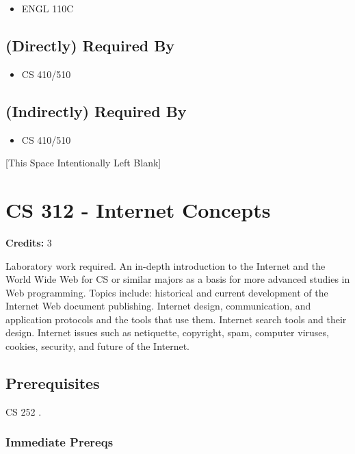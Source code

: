 \documentclass[]{article}
\providecommand{\tightlist}{%
  \setlength{\itemsep}{0pt}\setlength{\parskip}{0pt}}
\newcommand{\pagebreakhere}{
\vspace*{\fill}
\begin{center}
[This Space Intentionally Left Blank]
\end{center}
\vspace*{\fill}
\newpage
}
\begin{document}
\begin{itemize}
\tightlist
\item
  ENGL 110C
\end{itemize}

\subsection{(Directly) Required By}\label{directly-required-by-5}

\begin{itemize}
\tightlist
\item
  CS 410/510
\end{itemize}

\subsection{(Indirectly) Required By}\label{indirectly-required-by-5}

\begin{itemize}
\tightlist
\item
  CS 410/510
\end{itemize}

\pagebreakhere
\section{CS 312 - Internet Concepts}\label{cs-312---internet-concepts}

\textbf{Credits:} 3

Laboratory work required. An in-depth introduction to the Internet and
the World Wide Web for CS or similar majors as a basis for more advanced
studies in Web programming. Topics include: historical and current
development of the Internet Web document publishing. Internet design,
communication, and application protocols and the tools that use them.
Internet search tools and their design. Internet issues such as
netiquette, copyright, spam, computer viruses, cookies, security, and
future of the Internet.

\subsection{Prerequisites}\label{prerequisites-13}

CS 252 .

\subsubsection{Immediate Prereqs}\label{immediate-prereqs-8}
\end{document}
